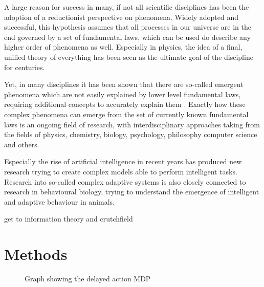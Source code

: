 \documentclass[12pt,a4paper]{article}
\begin{document}
A large reason for success in many, if not all scientific disciplines has been the adoption of a reductionist perspective on phenomena.
Widely adopted and successful, this hypothesis assumes that all processes in our universe are in the end governed by a set of fundamental laws, which can be used do describe any higher order of phenomena as well.
Especially in physics, the idea of a final, unified theory of everything has been seen as the ultimate goal of the discipline for centuries.

Yet, in many disciplines it has been shown that there are so-called emergent phenomena which are not easily explained by lower level fundamental laws, requiring additional concepts to accurately explain them \autocite{anderson1972more}.
Exactly how these complex phenomena can emerge from the set of currently known fundamental laws is an ongoing field of research, with interdisciplinary approaches taking from the fields of physics, chemistry, biology, psychology, philosophy computer science and others.

Especially the rise of artificial intelligence in recent years has produced new research trying to create complex models able to perform intelligent tasks.
Research into  so-called complex adaptive systems is also closely connected to research in behavioural biology, trying to understand the emergence of intelligent and adaptive behaviour in animals.

get to information theory and crutchfield

\section{Methods} \label{sec:methods}

\begin{figure}[H]
    \centering
    \caption{\label{fig:delayed_mdp} Graph showing the delayed action MDP}
\end{figure}
\end{document}
